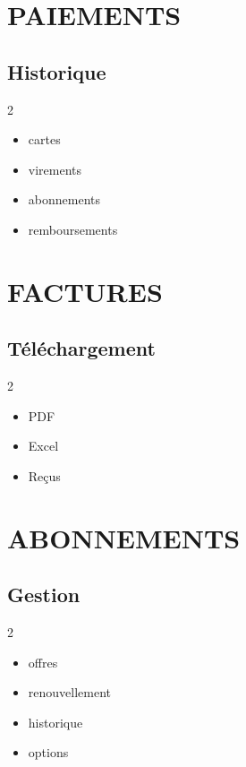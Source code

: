 \documentclass[12pt,a4paper,oneside]{book}
\begin{document}
\chapter{PAIEMENTS}

\section{Historique}
\begin{multicols}{2}
\begin{itemize}
\item cartes
\item virements
\item abonnements
\item remboursements
\end{itemize}
\end{multicols}

\chapter{FACTURES}

\section{Téléchargement}
\begin{multicols}{2}
\begin{itemize}
\item PDF
\item Excel
\item Reçus
\end{itemize}
\end{multicols}

\chapter{ABONNEMENTS}

\section{Gestion}
\begin{multicols}{2}
\begin{itemize}
\item offres
\item renouvellement
\item historique
\item options
\end{itemize}
\end{multicols}
\end{document}
